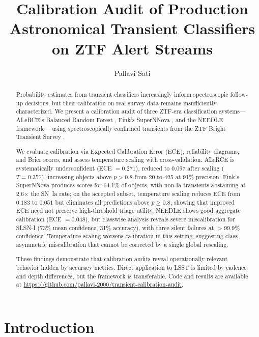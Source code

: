 \documentclass[twocolumn]{aastex631}
\begin{document}
\title{Calibration Audit of Production Astronomical Transient Classifiers on ZTF Alert Streams}

\author{Pallavi Sati}

\begin{abstract}
Probability estimates from transient classifiers increasingly inform
spectroscopic follow-up decisions, but their calibration on real survey
data remains insufficiently characterized. We present a calibration audit
of three ZTF-era classification systems---ALeRCE's Balanced Random Forest
\citep{forster2021}, Fink's SuperNNova \citep{moller2020}, and the NEEDLE
framework \citep{sheng2024}---using spectroscopically confirmed transients
from the ZTF Bright Transient Survey \citep{fremling2020}.

We evaluate calibration via Expected Calibration Error (ECE), reliability
diagrams, and Brier scores, and assess temperature scaling \citep{guo2017}
with cross-validation. ALeRCE is systematically underconfident
(ECE $= 0.271$), reduced to $0.097$ after scaling ($T = 0.357$),
increasing objects above $p > 0.8$ from 20 to 425 at 91\% precision.
Fink's SuperNNova produces scores for 64.1\% of objects, with non-Ia
transients abstaining at 2.6$\times$ the SN~Ia rate; on the accepted
subset, temperature scaling reduces ECE from $0.183$ to $0.051$ but
eliminates all predictions above $p \geq 0.8$, showing that improved
ECE need not preserve high-threshold triage utility. NEEDLE shows good
aggregate calibration (ECE $= 0.048$), but classwise analysis reveals
severe miscalibration for SLSN-I (73\% mean confidence, 31\% accuracy),
with three silent failures at $>$99.9\% confidence. Temperature scaling
worsens calibration in this setting, suggesting class-asymmetric
miscalibration that cannot be corrected by a single global rescaling.

These findings demonstrate that calibration audits reveal operationally
relevant behavior hidden by accuracy metrics. Direct application to LSST
is limited by cadence and depth differences, but the framework is
transferable. Code and results are available at
\url{https://github.com/pallavi-2000/transient-calibration-audit}.
\end{abstract}


\section{Introduction}\label{sec:intro}
\end{document}
